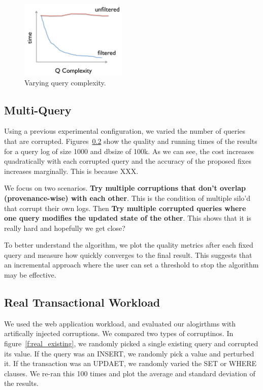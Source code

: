\begin{figure}[h]
\centering
\includegraphics[width = 2in]{figures/complete_qfilter_complexity}
\caption{Varying query complexity.}
\label{f:complete_qfilter_complexity} 
\end{figure}



\subsection{Multi-Query}

Using a previous experimental configuration, we varied the number of queries that are corrupted.  Figures~\ref{}
show the quality and running times of the results for a query log of size 1000 and dbsize of 100k.  
As we can see, the cost increases quadratically with each corrupted query and the accuracy of the proposed fixes increases marginally.  
This is because XXX.

We focus on two scenarios.  {\bf Try multiple corruptions that don't overlap (provenance-wise) with each other}.  This is the condition of multiple silo'd that
corrupt their own logs.  Then {\bf Try multiple corrupted queries where one query modifies the updated state of the other}.  This shows that
it is really hard and hopefully we get close?



To better understand the algorithm, we plot the quality metrics after each fixed query and measure how quickly \sys converges to the final result. 
This suggests that an incremental approach where the user can set a threshold to stop the algorithm may be effective.



\subsection{Real Transactional Workload}

We used the web application workload, and evaluated our alogirthms with artifically injected corruptions.
We compared two types of corruptinos.  In figure~\ref{f:real_existing}, we randomly picked a single existing 
query and corrupted its value.  If the query was an INSERT, we randomly pick a value and perturbed it.
If the transaction was an UPDAET, we randomly varied the SET or WHERE clauses.   We re-ran this
100 times and plot the average and standard deviation of the results.

